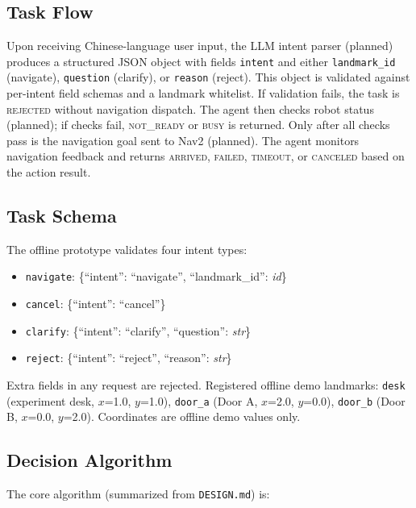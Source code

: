 \documentclass[conference]{IEEEtran}
\begin{document}
\subsection{Task Flow}

Upon receiving Chinese-language user input, the LLM intent parser (planned) produces
a structured JSON object with fields \texttt{intent} and either \texttt{landmark\_id}
(navigate), \texttt{question} (clarify), or \texttt{reason} (reject). This object is
validated against per-intent field schemas and a landmark whitelist. If validation
fails, the task is \textsc{rejected} without navigation dispatch. The agent then checks
robot status (planned); if checks fail, \textsc{not\_ready} or \textsc{busy} is
returned. Only after all checks pass is the navigation goal sent to Nav2 (planned).
The agent monitors navigation feedback and returns \textsc{arrived}, \textsc{failed},
\textsc{timeout}, or \textsc{canceled} based on the action result.

\subsection{Task Schema}

The offline prototype validates four intent types:
\begin{itemize}
  \item \texttt{navigate}: \{``intent'': ``navigate'', ``landmark\_id'': \textit{id}\}
  \item \texttt{cancel}: \{``intent'': ``cancel''\}
  \item \texttt{clarify}: \{``intent'': ``clarify'', ``question'': \textit{str}\}
  \item \texttt{reject}: \{``intent'': ``reject'', ``reason'': \textit{str}\}
\end{itemize}
Extra fields in any request are rejected. Registered offline demo landmarks:
\texttt{desk} (experiment desk, $x$=1.0, $y$=1.0), \texttt{door\_a} (Door A, $x$=2.0, $y$=0.0),
\texttt{door\_b} (Door B, $x$=0.0, $y$=2.0). Coordinates are offline demo values only.

\subsection{Decision Algorithm}

The core algorithm (summarized from \texttt{DESIGN.md}) is:
\end{document}
